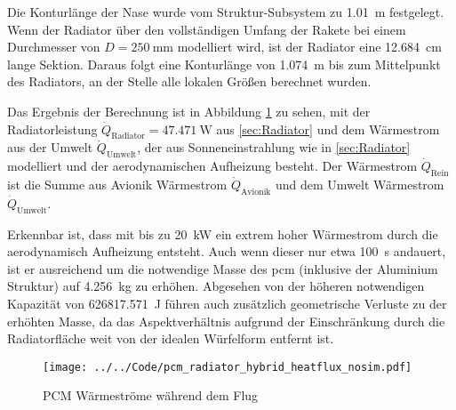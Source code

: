 Die Konturlänge der Nase wurde vom Struktur-Subsystem zu \SI{1,01}{\meter} festgelegt. Wenn der Radiator über den vollständigen Umfang der Rakete
bei einem Durchmesser von $D = \SI{250}{\milli\meter}$ modelliert wird, ist der Radiator eine \SI{12,684}{\centi\meter} lange Sektion.
Daraus folgt eine Konturlänge von \SI{1,074}{\meter} bis zum Mittelpunkt des Radiators, an der Stelle alle lokalen Größen berechnet wurden.

Das Ergebnis der Berechnung ist in Abbildung \ref{fig:pcm_waermestrom_vorauslegung} zu sehen, mit der Radiatorleistung $\dot{Q}_\mathrm{Radiator} = \SI{47.471}{\watt}$
aus \ref{sec:Radiator} und dem Wärmestrom aus der Umwelt $\dot{Q}_\mathrm{Umwelt}$, der aus Sonneneinstrahlung wie in \ref{sec:Radiator} modelliert
und der aerodynamischen Aufheizung besteht.
Der Wärmestrom $\dot{Q}_\mathrm{Rein}$ ist die Summe aus Avionik Wärmestrom $\dot{Q}_\mathrm{Avionik}$ und dem Umwelt Wärmestrom $\dot{Q}_\mathrm{Umwelt}$.

Erkennbar ist, dass mit bis zu \SI{20}{\kilo\watt} ein extrem hoher Wärmestrom durch die aerodynamisch Aufheizung entsteht.
Auch wenn dieser nur etwa \SI{100}{\second} andauert, ist er ausreichend um die notwendige Masse des \ac{pcm} (inklusive der Aluminium Struktur)
auf \SI{4,256}{\kilo\gram} zu erhöhen. Abgesehen von der höheren notwendigen Kapazität von \SI{626817.571}{\joule} führen auch zusätzlich geometrische
Verluste zu der erhöhten Masse, da das Aspektverhältnis aufgrund der Einschränkung durch die Radiatorfläche weit von der idealen Würfelform entfernt ist.

\begin{figure}
  \centering
  \texttt{[image: ../../Code/pcm\_radiator\_hybrid\_heatflux\_nosim.pdf]}
  \caption{PCM Wärmeströme während dem Flug}\label{fig:pcm_waermestrom_vorauslegung}
\end{figure}